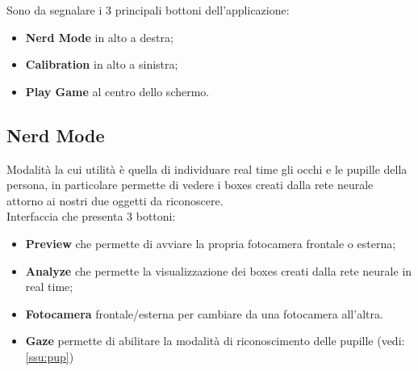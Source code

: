 \documentclass[11pt]{article}
\begin{document}
Sono da segnalare i 3 principali bottoni dell'applicazione:
\begin{itemize}
\item \textbf{Nerd Mode} in alto a destra;
\item \textbf{Calibration} in alto a sinistra;
\item \textbf{Play Game} al centro dello schermo.
\end{itemize}

\subsection{Nerd Mode}
\label{sub:ner}
Modalità la cui utilità è quella di individuare real time gli occhi e le pupille della persona, in particolare permette di vedere i boxes creati dalla rete neurale attorno ai nostri due oggetti da riconoscere.
\\Interfaccia che presenta 3 bottoni:
\begin{itemize}
    \item \textbf{Preview} che permette di avviare la propria fotocamera frontale o esterna;
    \item \textbf{Analyze} che permette la visualizzazione dei boxes creati dalla rete neurale in real time;
    \item \textbf{Fotocamera} frontale/esterna per cambiare da una fotocamera all'altra.
    \item \textbf{Gaze} permette di abilitare la modalità di riconoscimento delle pupille (vedi: \ref{ssu:pup})
\end{itemize}
\end{document}
